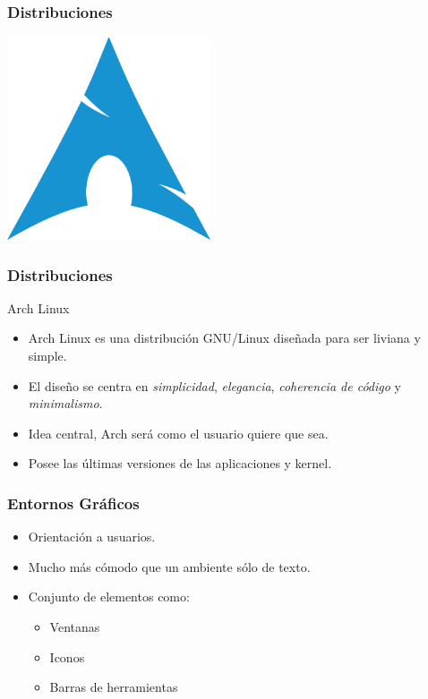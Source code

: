 \frame
{
\frametitle{Distribuciones}
\vspace{1cm}
\begin{center}
	\includegraphics[width=6cm]{img/arch}
\end{center}
}

\frame
{
\frametitle{Distribuciones}
\Large{Arch Linux}
\normalsize
\begin{itemize}
	\item Arch Linux es una distribución GNU/Linux diseñada para ser liviana y simple.
	\item El diseño se centra en \emph{simplicidad}, \emph{elegancia}, \emph{coherencia de código} y \emph{minimalismo}.
	\item Idea central, Arch será como el usuario quiere que sea.
	\item Posee las últimas versiones de las aplicaciones y kernel.
\end{itemize}
}



\frame
{
\frametitle{Entornos Gráficos}
\begin{itemize}
	\item Orientación a usuarios.
	\item Mucho más cómodo que un ambiente sólo de texto.
	\item Conjunto de elementos como:
	\begin{itemize}
		\item Ventanas
		\item Iconos
		\item Barras de herramientas
	\end{itemize}
\end{itemize}
}

